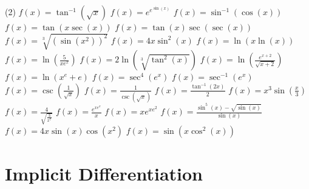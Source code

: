 \documentclass[10pt,oneside,]{book}
\theoremstyle{plain}
\theoremstyle{definition}
\numberwithin{equation}{section}
\newcommand{\fe}[2]{#1\mathopen{}\left(#2\right)\mathclose{}}
\begin{document}
\begin{exercisegroup}(2)
\exercise[16.]\hypertarget{exercise-497}{\null}\(\fe{f}{x}=\fe{\tan^{-1}}{\sqrt{x}}\)%
\exercise[17.]\hypertarget{exercise-498}{\null}\(\fe{f}{x}=e^{e^{\fe{\sin}{x}}}\)%
\exercise[18.]\hypertarget{exercise-499}{\null}\(\fe{f}{x}=\fe{\sin^{-1}}{\fe{\cos}{x}}\)%
\exercise[19.]\hypertarget{exercise-500}{\null}\(\fe{f}{x}=\fe{\tan}{x\fe{\sec}{x}}\)%
\exercise[20.]\hypertarget{exercise-501}{\null}\(\fe{f}{x}=\fe{\tan}{x}\fe{\sec}{\fe{\sec}{x}}\)%
\exercise[21.]\hypertarget{exercise-502}{\null}\(\fe{f}{x}=\sqrt[3]{\left(\fe{\sin}{x^2}\right)^2}\)%
\exercise[22.]\hypertarget{exercise-503}{\null}\(\fe{f}{x}=4x\fe{\sin^2}{x}\)%
\exercise[23.]\hypertarget{exercise-504}{\null}\(\fe{f}{x}=\fe{\ln}{x\fe{\ln}{x}}\)%
\exercise[24.]\hypertarget{exercise-505}{\null}\(\fe{f}{x}=\fe{\ln}{\frac{5}{xe^x}}\)%
\exercise[25.]\hypertarget{exercise-506}{\null}\(\fe{f}{x}=2\fe{\ln}{\sqrt[3]{\fe{\tan^2}{x}}}\)%
\exercise[26.]\hypertarget{exercise-507}{\null}\(\fe{f}{x}=\fe{\ln}{\frac{e^{x+2}}{\sqrt{x+2}}}\)%
\exercise[27.]\hypertarget{exercise-508}{\null}\(\fe{f}{x}=\fe{\ln}{x^e+e}\)%
\exercise[28.]\hypertarget{exercise-509}{\null}\(\fe{f}{x}=\fe{\sec^4}{e^x}\)%
\exercise[29.]\hypertarget{exercise-510}{\null}\(\fe{f}{x}=\fe{\sec^{-1}}{e^x}\)%
\exercise[30.]\hypertarget{exercise-511}{\null}\(\fe{f}{x}=\fe{\csc}{\frac{1}{\sqrt{x}}}\)%
\exercise[31.]\hypertarget{exercise-512}{\null}\(\fe{f}{x}=\frac{1}{\fe{\csc}{\sqrt{x}}}\)%
\exercise[32.]\hypertarget{exercise-513}{\null}\(\fe{f}{x}=\frac{\fe{\tan^{-1}}{2x}}{2}\)%
\exercise[33.]\hypertarget{exercise-514}{\null}\(\fe{f}{x}=x^3\fe{\sin}{\frac{x}{3}}\)%
\exercise[34.]\hypertarget{exercise-515}{\null}\(\fe{f}{x}=\frac{4}{\sqrt{\frac{3}{x^7}}}\)%
\exercise[35.]\hypertarget{exercise-516}{\null}\(\fe{f}{x}=\frac{e^{xe^x}}{x}\)%
\exercise[36.]\hypertarget{exercise-517}{\null}\(\fe{f}{x}=xe^{xe^2}\)%
\exercise[37.]\hypertarget{exercise-518}{\null}\(\fe{f}{x}=\frac{\fe{\sin^5}{x}-\sqrt{\fe{\sin}{x}}}{\fe{\sin}{x}}\)%
\exercise[38.]\hypertarget{exercise-519}{\null}\(\fe{f}{x}=4x\fe{\sin}{x}\fe{\cos}{x^2}\)%
\exercise[39.]\hypertarget{exercise-520}{\null}\(\fe{f}{x}=\fe{\sin}{x\fe{\cos^2}{x}}\)%
\end{exercisegroup}
\par\smallskip\noindent
\typeout{************************************************}
\typeout{************************************************}
\chapter[Implicit Differentiation]{Implicit Differentiation}\label{chapter-implicit-differentiation}
\typeout{************************************************}
\typeout{************************************************}
\end{document}

